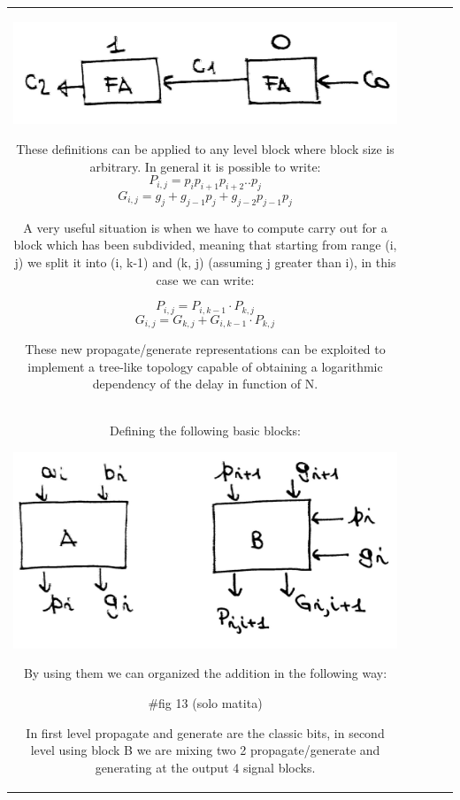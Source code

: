 \begin{center}
\begin{tabular}{|c|c|c|c|c|}
\begin{center}
  \includegraphics[width=0.6\linewidth]{img/img2/11}
\end{center}


These definitions can be applied to any level block where block size is arbitrary. In general it is possible to write:
$$P_{i,j}=p_ip_{i+1}p_{i+2}..p_{j}$$
$$G_{i,j}=g_j+g_{j-1}p_j+g_{j-2}p_{j-1}p_j$$

A very useful situation is when we have to compute carry out for a block which has been subdivided, meaning that starting from range (i, j) we split it into (i, k-1) and (k, j) (assuming j greater than i), in this case we can write:

$$P_{i,j}=P_{i, k-1} \cdot P_{k, j}$$
$$ G_{i, j}=G_{k, j}+G_{i, k-1}\cdot P_{k, j}$$

These new propagate/generate representations can be exploited to implement a tree-like topology capable of obtaining a logarithmic dependency of the delay in function of N.\\

Defining the following basic blocks:

\begin{center}
  \includegraphics[width=0.6\linewidth]{img/img2/12}
\end{center}

By using them we can organized the addition in the following way:

 $\#$fig 13 (solo matita)

In first level propagate and generate are the classic bits, in second level using block B we are mixing two 2 propagate/generate and generating at the output 4 signal blocks.


\end{tabular}
\end{center}
